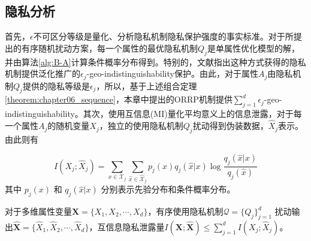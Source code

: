 \subsection{隐私分析}\label{subsec:privacy_analysis}
首先，$\epsilon$不可区分等级是量化、分析隐私机制隐私保护强度的事实标准。对于所提出的有序随机扰动方案，每一个属性的最优隐私机制$Q_j$是单属性优化模型的解，并由算法\ref{alg:B-A}计算条件概率分布得到。特别的，文献指出这种方式获得的隐私机制提供泛化推广的$\epsilon_j$-geo-indistinguishability保护。由此，对于属性$A_j$由隐私机制$Q_j$提供的隐私等级是$\epsilon_j$，所以，基于上述组合定理\ref{theorem:chapter06_sequence}，本章中提出的ORRP机制提供$\sum_{j=1}^{d}\epsilon_j$-geo-indistinguishability。其次，使用互信息(MI)量化平均意义上的信息泄露，对于每一个属性$A_j$的随机变量$X_j$，独立的使用隐私机制$Q_j$扰动得到伪装数据，$\hat{X}_j$表示。由此则有

\begin{equation}
	I(X_j;\hat{X}_j)=\sum_{x\in\mathcal{X}_j}\sum_{\hat{x}\in\hat{\mathcal{X}}_j}p_j(x)q_j(\hat{x}|x)\log\frac{q_j(\hat{x}|x)}{q_j(\hat{x})}
\end{equation}
其中 $p_j(x)$ 和 $q_j(\hat{x}|x)$ 分别表示先验分布和条件概率分布。

\begin{theorem}\label{theorem:upper bound} 对于多维属性变量$\bm{X}=\{X_1,X_2,\cdots,X_d\}$，有序使用隐私机制$\mathcal{Q}=\{Q_j\}_{j=1}^{d}$ 扰动输出$\hat{\bm{X}}=\{\hat{X}_1,\hat{X}_2,\cdots, \hat{X}_d\}$，互信息隐私泄露量$I(\bm{X};\hat{\bm{X}})\leq \sum_{j=1}^{d}I(X_j;\hat{X}_j)$。
\end{theorem}

